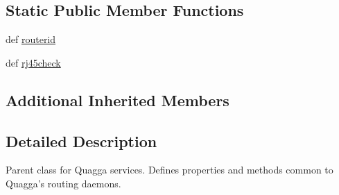 \subsection*{Static Public Member Functions}
\begin{DoxyCompactItemize}
\item 
def \hyperlink{classcore_1_1services_1_1quagga_1_1_quagga_service_a98788c82d939c5c4bfdfede3b200cbdf}{routerid}
\item 
def \hyperlink{classcore_1_1services_1_1quagga_1_1_quagga_service_a52b86b94f469c1f31d7e308dc7310be8}{rj45check}
\end{DoxyCompactItemize}
\subsection*{Additional Inherited Members}


\subsection{Detailed Description}
\begin{DoxyVerb}Parent class for Quagga services. Defines properties and methods
    common to Quagga's routing daemons.
\end{DoxyVerb}
 

